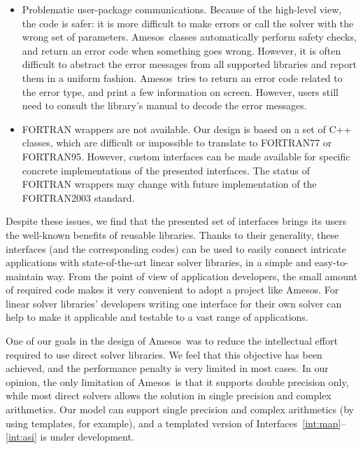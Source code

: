\documentclass[acmtoms,acmnow]{acmtrans2m}
\newcommand{\amesos}{{\sc Amesos}}
\begin{document}
\begin{itemize}
\item
Problematic user-package communications. Because of the high-level view, the
code is safer: it is more difficult to make errors or call the solver with the
wrong set of parameters. \amesos\ classes automatically perform safety checks,
and return an error code when something goes wrong. However, it is often
difficult to abstract the error messages from all supported libraries and
report them in a uniform fashion.  \amesos\ tries to return an error code
related to the error type, and print a few information on screen. However,
users still need to consult the library's manual to decode the error messages.

\item FORTRAN wrappers are not available. Our design is based on a set of C++
classes, which are difficult or impossible to translate to FORTRAN77 or
FORTRAN95. However, custom interfaces can be made available for specific
concrete implementations of the presented interfaces. The status of FORTRAN
wrappers may change
with future implementation of the FORTRAN2003 standard.
\end{itemize}

%

Despite these issues, we find that the presented set of interfaces
brings its users the well-known benefits of reusable libraries.
Thanks to their generality, these interfaces (and the corresponding
codes) can be used to easily connect intricate applications with
state-of-the-art linear solver libraries, in a simple and
easy-to-maintain way. From the point of view of application
developers, the small amount of required code makes it very
convenient to adopt a project like \amesos. For linear solver
libraries' developers  writing one interface for their own solver
can help to make it applicable and testable to a vast range of
applications.

One of our goals in the design of \amesos\ was to reduce the intellectual
effort required to use direct solver libraries. We feel that this objective
has been achieved, and the performance penalty is very limited in most cases.
In our opinion, the only limitation of \amesos\ is that it supports double
precision only, while most direct solvers allows the solution in single
precision and complex arithmetics.  Our model can support single precision and
complex arithmetics (by using templates, for example), and a templated
version of Interfaces~\ref{int:map}--\ref{int:asi} is under
development.
\end{document}
